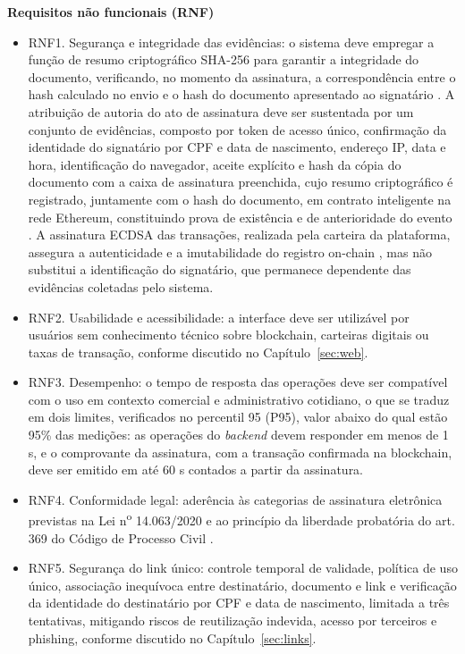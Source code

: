 \documentclass[
    12pt,
    a4paper,
    oneside,
    chapter=TITLE,
    section=TITLE,
    subsection=TITLE,
    subsubsection=TITLE,
    sumario=tradicional,
    english,
    brazil
]{abntex2}
\begin{document}
\textbf{Requisitos não funcionais (RNF)}

\begin{itemize}
    \item RNF1. Segurança e integridade das evidências: o sistema deve empregar a função de resumo criptográfico SHA-256 para garantir a integridade do documento, verificando, no momento da assinatura, a correspondência entre o hash calculado no envio e o hash do documento apresentado ao signatário \cite{stallings2017}. A atribuição de autoria do ato de assinatura deve ser sustentada por um conjunto de evidências, composto por token de acesso único, confirmação da identidade do signatário por CPF e data de nascimento, endereço IP, data e hora, identificação do navegador, aceite explícito e hash da cópia do documento com a caixa de assinatura preenchida, cujo resumo criptográfico é registrado, juntamente com o hash do documento, em contrato inteligente na rede Ethereum, constituindo prova de existência e de anterioridade do evento \cite{haber1991}. A assinatura ECDSA das transações, realizada pela carteira da plataforma, assegura a autenticidade e a imutabilidade do registro on-chain \cite{nist2023}, mas não substitui a identificação do signatário, que permanece dependente das evidências coletadas pelo sistema.

    \item RNF2. Usabilidade e acessibilidade: a interface deve ser
    utilizável por usuários sem conhecimento técnico sobre
    blockchain, carteiras digitais ou taxas de transação, conforme
    discutido no Capítulo~\ref{sec:web}.

    \item RNF3. Desempenho: o tempo de resposta das operações deve
    ser compatível com o uso em contexto comercial e administrativo
    cotidiano, o que se traduz em dois limites, verificados no
    percentil 95 (P95), valor abaixo do qual estão 95\% das medições:
    as operações do \emph{backend} devem responder em menos de 1 s, e
    o comprovante da assinatura, com a transação confirmada na
    blockchain, deve ser emitido em até 60 s contados a partir da
    assinatura.

    \item RNF4. Conformidade legal: aderência às categorias de
    assinatura eletrônica previstas na Lei n\textsuperscript{o}
    14.063/2020 \cite{brasil2020} e ao princípio da liberdade
    probatória do art. 369 do Código de Processo Civil \cite{brasil2015}.

    \item RNF5. Segurança do link único: controle temporal de
    validade, política de uso único, associação inequívoca entre
    destinatário, documento e link e verificação da identidade do
    destinatário por CPF e data de nascimento, limitada a três
    tentativas, mitigando riscos de reutilização indevida, acesso por
    terceiros e phishing, conforme discutido no Capítulo~\ref{sec:links}.
\end{itemize}
\end{document}
